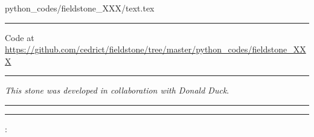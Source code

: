 \begin{flushright} {\tiny {\color{gray} python\_codes/fieldstone\_XXX/text.tex}} \end{flushright}



\par\noindent\rule{\textwidth}{0.4pt}

\begin{center}
Code at \url{https://github.com/cedrict/fieldstone/tree/master/python_codes/fieldstone_XXX}
\end{center}

\par\noindent\rule{\textwidth}{0.4pt}

{\sl This stone was developed in collaboration with Donald Duck}. 

\par\noindent\rule{\textwidth}{0.4pt}



\lipsum[2-4]



\par\noindent\rule{\textwidth}{0.4pt}

\vspace{.5cm}

\begin{center}
\end{center}

\vspace{.5cm}

\Literature:\\


